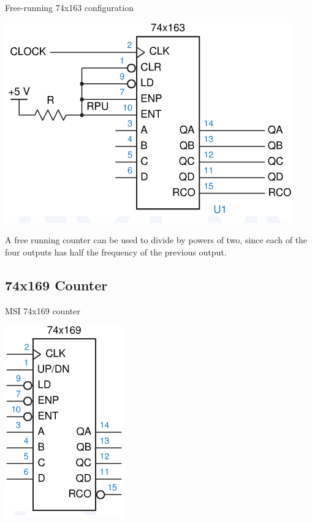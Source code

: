 \begin{frame}{Free-running 74x163 configuration}
  \begin{center}
    \includegraphics[scale=0.4]{74x163SchematicFreeRunning}
  \end{center}
  A free running counter can be used to divide by powers of two, since each of the four outputs has half the frequency of the previous output.
\end{frame}

\subsection{74x169 Counter}

\begin{frame}{MSI 74x169 counter}
  \begin{center}
    \includegraphics[scale=0.5]{74x169Schematic}
  \end{center}
\end{frame}

